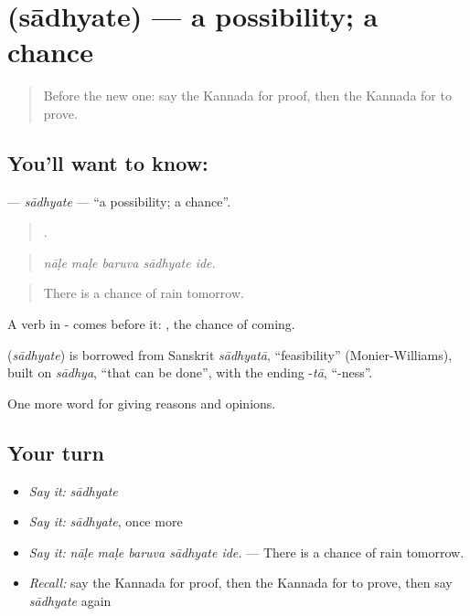 \section[\texorpdfstring{\kn{ಸಾಧ್ಯತೆ} (sādhyate)}{ಸಾಧ್ಯತೆ (sādhyate)}]{ (sādhyate) — a possibility; a chance}

\label{lesson:KA-C376-sadhyate}



\begin{quote}
Before the new one: say the Kannada for proof, then the Kannada for to prove.
\end{quote}

\subsection*{You'll want to know: }
\textbf{} — \emph{sādhyate} — \textquotedblleft{}a possibility; a chance\textquotedblright{}.

\begin{quote}
    .
\end{quote}

\begin{quote}
\emph{nāḷe maḷe baruva sādhyate ide.}
\end{quote}

\begin{quote}
There is a chance of rain tomorrow.
\end{quote}

A verb in - comes before it:  , the chance of coming.

\begin{cousinweb}
\textbf{} (\emph{sādhyate}) is borrowed from Sanskrit \emph{sādhyatā}, \textquotedblleft{}feasibility\textquotedblright{} (Monier-Williams), built on \emph{sādhya}, \textquotedblleft{}that can be done\textquotedblright{}, with the ending -\emph{tā}, \textquotedblleft{}-ness\textquotedblright{}.
\end{cousinweb}

\begin{grammarlens}[title={What you've built}]
One more word for giving reasons and opinions.
\end{grammarlens}

\subsection*{Your turn}
\begin{itemize}
\raggedright
  \item \emph{Say it:} \emph{sādhyate}
  \item \emph{Say it:} \emph{sādhyate}, once more
  \item \emph{Say it:} \emph{nāḷe maḷe baruva sādhyate ide.} — There is a chance of rain tomorrow.
  \item \emph{Recall:} say the Kannada for proof, then the Kannada for to prove, then say \emph{sādhyate} again
\end{itemize}

